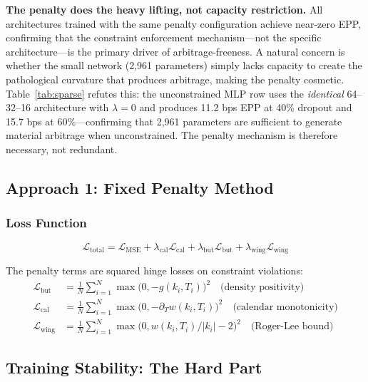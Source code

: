 \documentclass[11pt,a4paper]{article}
\newcommand{\loss}{\mathcal{L}}
\begin{document}
\textbf{The penalty does the heavy lifting, not capacity restriction.} All architectures trained with the same penalty configuration achieve near-zero EPP, confirming that the constraint enforcement mechanism---not the specific architecture---is the primary driver of arbitrage-freeness. A natural concern is whether the small network (2,961 parameters) simply lacks capacity to create the pathological curvature that produces arbitrage, making the penalty cosmetic. Table~\ref{tab:sparse} refutes this: the unconstrained MLP row uses the \textit{identical} 64--32--16 architecture with $\lambda = 0$ and produces 11.2 bps EPP at 40\% dropout and 15.7 bps at 60\%---confirming that 2,961 parameters are sufficient to generate material arbitrage when unconstrained. The penalty mechanism is therefore necessary, not redundant.

\subsection{Approach 1: Fixed Penalty Method}
\label{sec:penalty}

\subsubsection{Loss Function}

\begin{equation}
    \loss_{\text{total}} = \loss_{\text{MSE}} + \lambda_{\text{cal}} \loss_{\text{cal}} + \lambda_{\text{but}} \loss_{\text{but}} + \lambda_{\text{wing}} \loss_{\text{wing}}
\end{equation}

The penalty terms are squared hinge losses on constraint violations:
\begin{align}
    \loss_{\text{but}} &= \frac{1}{N}\sum_{i=1}^{N} \max\bigl(0, -g(k_i, T_i)\bigr)^2 \quad \text{(density positivity)} \\
    \loss_{\text{cal}} &= \frac{1}{N}\sum_{i=1}^{N} \max\bigl(0, -\partial_T w(k_i, T_i)\bigr)^2 \quad \text{(calendar monotonicity)} \\
    \loss_{\text{wing}} &= \frac{1}{N}\sum_{i=1}^{N} \max\bigl(0, w(k_i, T_i)/|k_i| - 2\bigr)^2 \quad \text{(Roger-Lee bound)}
\end{align}

\subsection{Training Stability: The Hard Part}
\end{document}
